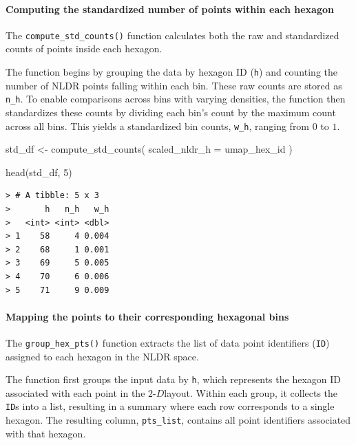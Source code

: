 \documentclass[
  11pt,
  a4paper,
]{report}
\newenvironment{Shaded}{\begin{snugshade}}{\end{snugshade}}
\newcommand{\AttributeTok}[1]{\textcolor[rgb]{0.40,0.45,0.13}{#1}}
\newcommand{\DecValTok}[1]{\textcolor[rgb]{0.68,0.00,0.00}{#1}}
\newcommand{\FunctionTok}[1]{\textcolor[rgb]{0.28,0.35,0.67}{#1}}
\newcommand{\NormalTok}[1]{\textcolor[rgb]{0.00,0.23,0.31}{#1}}
\newcommand{\OtherTok}[1]{\textcolor[rgb]{0.00,0.23,0.31}{#1}}
\newcommand{\twoD}{$2\text{-}D$}
\begin{document}
\paragraph{Computing the standardized number of points within each
hexagon}\label{computing-the-standardized-number-of-points-within-each-hexagon}

The \texttt{compute\_std\_counts()} function calculates both the raw and
standardized counts of points inside each hexagon.

The function begins by grouping the data by hexagon ID (\texttt{h}) and
counting the number of NLDR points falling within each bin. These raw
counts are stored as \texttt{n\_h}. To enable comparisons across bins
with varying densities, the function then standardizes these counts by
dividing each bin's count by the maximum count across all bins. This
yields a standardized bin counts, \texttt{w\_h}, ranging from \(0\) to
\(1\).

\begin{Shaded}
\begin{Highlighting}[]
\NormalTok{std\_df }\OtherTok{\textless{}{-}} \FunctionTok{compute\_std\_counts}\NormalTok{(}
  \AttributeTok{scaled\_nldr\_h =}\NormalTok{ umap\_hex\_id}
\NormalTok{  )}

\FunctionTok{head}\NormalTok{(std\_df, }\DecValTok{5}\NormalTok{)}
\end{Highlighting}
\end{Shaded}

\begin{verbatim}
> # A tibble: 5 x 3
>       h   n_h   w_h
>   <int> <int> <dbl>
> 1    58     4 0.004
> 2    68     1 0.001
> 3    69     5 0.005
> 4    70     6 0.006
> 5    71     9 0.009
\end{verbatim}

\paragraph{Mapping the points to their corresponding hexagonal
bins}\label{mapping-the-points-to-their-corresponding-hexagonal-bins}

The \texttt{group\_hex\_pts()} function extracts the list of data point
identifiers (\texttt{ID}) assigned to each hexagon in the NLDR space.

The function first groups the input data by \texttt{h}, which represents
the hexagon ID associated with each point in the \twoD layout. Within
each group, it collects the \texttt{ID}s into a list, resulting in a
summary where each row corresponds to a single hexagon. The resulting
column, \texttt{pts\_list}, contains all point identifiers associated
with that hexagon.
\end{document}
